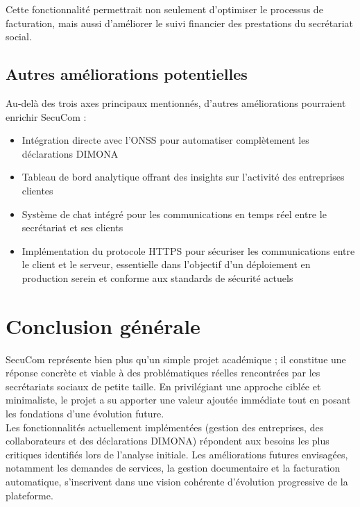 Cette fonctionnalité permettrait non seulement d'optimiser le processus de facturation, mais aussi d'améliorer le suivi financier des prestations du secrétariat social.

\subsection*{Autres améliorations potentielles}

Au-delà des trois axes principaux mentionnés, d'autres améliorations pourraient enrichir SecuCom :

\begin{itemize}[leftmargin=*,label=\textcolor{darkgray}{$\bullet$},itemsep=0.3em]
  \item Intégration directe avec l'ONSS pour automatiser complètement les déclarations DIMONA
  \item Tableau de bord analytique offrant des insights sur l'activité des entreprises clientes
  \item Système de chat intégré pour les communications en temps réel entre le secrétariat et ses clients
  \item Implémentation du protocole HTTPS pour sécuriser les communications entre le client et le serveur, essentielle dans l'objectif d'un déploiement en production serein et conforme aux standards de sécurité actuels
\end{itemize}

\section*{Conclusion générale}

SecuCom représente bien plus qu'un simple projet académique ; il constitue une réponse concrète et viable à des problématiques réelles rencontrées par les secrétariats sociaux de petite taille. En privilégiant une approche ciblée et minimaliste, le projet a su apporter une valeur ajoutée immédiate tout en posant les fondations d'une évolution future.\\

Les fonctionnalités actuellement implémentées (gestion des entreprises, des collaborateurs et des déclarations DIMONA) répondent aux besoins les plus critiques identifiés lors de l'analyse initiale. Les améliorations futures envisagées, notamment les demandes de services, la gestion documentaire et la facturation automatique, s'inscrivent dans une vision cohérente d'évolution progressive de la plateforme.\\

